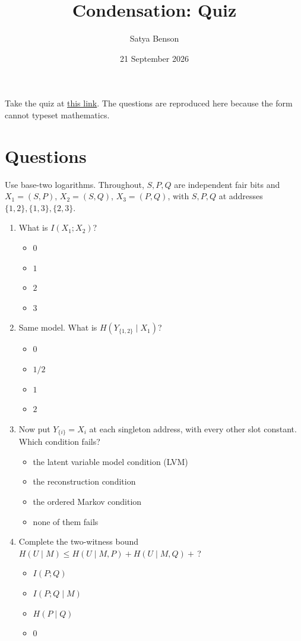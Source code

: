 \documentclass[11pt]{article}
\title{Condensation: Quiz}
\author{Satya Benson}
\date{21 September 2026}
\begin{document}
\maketitle

Take the quiz at
\href{https://docs.google.com/forms/d/e/1FAIpQLSdTAs3Dq6dOeoju0TsyfaVcEcRdZaNgpAe_FMC7rCR3fohOSw/viewform}{this
link}. The questions are reproduced here because the form cannot typeset
mathematics.

\section{Questions}
Use base-two logarithms. Throughout, $S,P,Q$ are independent fair bits and
$X_1=(S,P)$, $X_2=(S,Q)$, $X_3=(P,Q)$, with $S,P,Q$ at addresses
$\{1,2\},\{1,3\},\{2,3\}$.

\begin{enumerate}
\item What is $I(X_1;X_2)$?
\begin{itemize}
\item $0$
\item $1$
\item $2$
\item $3$
\end{itemize}

\item Same model. What is $H(Y_{\{1,2\}}\mid X_1)$?
\begin{itemize}
\item $0$
\item $1/2$
\item $1$
\item $2$
\end{itemize}

\item Now put $Y_{\{i\}}=X_i$ at each singleton address, with every other slot
constant. Which condition fails?
\begin{itemize}
\item the latent variable model condition (LVM)
\item the reconstruction condition
\item the ordered Markov condition
\item none of them fails
\end{itemize}

\item Complete the two-witness bound
$H(U\mid M)\le H(U\mid M,P)+H(U\mid M,Q)+{}$\,?
\begin{itemize}
\item $I(P;Q)$
\item $I(P;Q\mid M)$
\item $H(P\mid Q)$
\item $0$
\end{itemize}


\end{enumerate}
\end{document}
